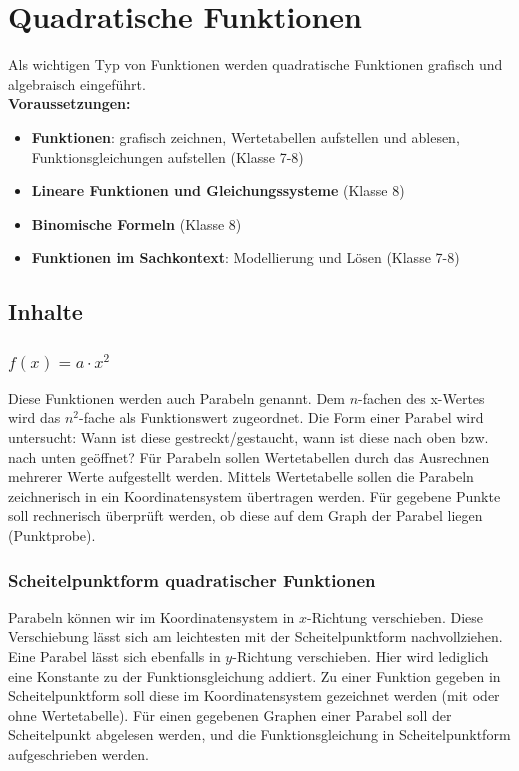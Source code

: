 \documentclass{article}
\begin{document}
\section{Quadratische Funktionen}
Als wichtigen Typ von Funktionen werden quadratische Funktionen grafisch und algebraisch eingeführt.\\
\textbf{Voraussetzungen:}
\begin{itemize}
    \item \textbf{Funktionen}: grafisch zeichnen, Wertetabellen aufstellen und ablesen, Funktionsgleichungen aufstellen (Klasse 7-8)
    \item \textbf{Lineare Funktionen und Gleichungssysteme} (Klasse 8)
    \item \textbf{Binomische Formeln} (Klasse 8)
    \item \textbf{Funktionen im Sachkontext}: Modellierung und Lösen (Klasse 7-8)
\end{itemize}
\subsection{Inhalte}
\subsubsection*{$f(x) = a \cdot x^2$}
Diese Funktionen werden auch Parabeln genannt. Dem $n$-fachen des x-Wertes wird das $n^2$-fache als Funktionswert zugeordnet.
Die Form einer Parabel wird untersucht: Wann ist diese gestreckt/gestaucht, wann ist diese nach oben bzw. nach unten geöffnet?
Für Parabeln sollen Wertetabellen durch das Ausrechnen mehrerer Werte aufgestellt werden.
Mittels Wertetabelle sollen die Parabeln zeichnerisch in ein Koordinatensystem übertragen werden.
Für gegebene Punkte soll rechnerisch überprüft werden, ob diese auf dem Graph der Parabel liegen (Punktprobe). 
\subsubsection*{Scheitelpunktform quadratischer Funktionen}
Parabeln können wir im Koordinatensystem in $x$-Richtung verschieben. Diese Verschiebung lässt sich am leichtesten mit der Scheitelpunktform nachvollziehen.
Eine Parabel lässt sich ebenfalls in $y$-Richtung verschieben. Hier wird lediglich eine Konstante zu der Funktionsgleichung addiert.
Zu einer Funktion gegeben in Scheitelpunktform soll diese im Koordinatensystem gezeichnet werden (mit oder ohne Wertetabelle).
Für einen gegebenen Graphen einer Parabel soll der Scheitelpunkt abgelesen werden, und die Funktionsgleichung in Scheitelpunktform aufgeschrieben werden.
\end{document}
